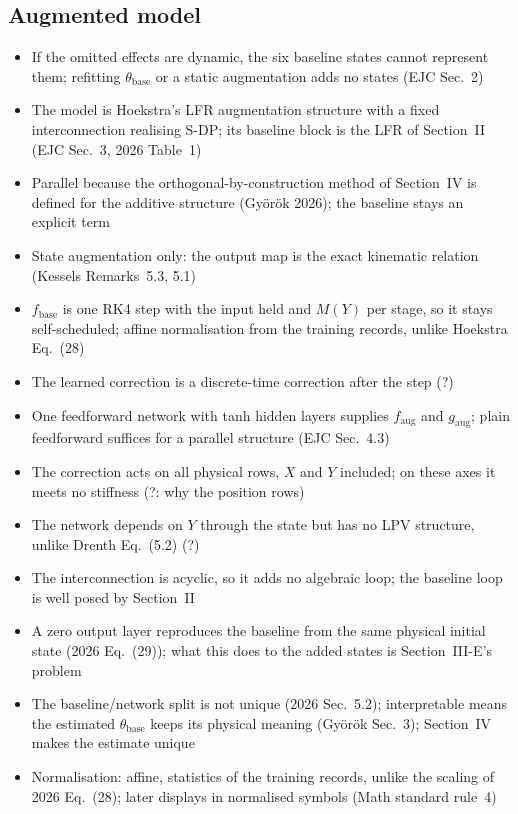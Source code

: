 \subsection{Augmented model}\label{sec:aug_structure}
\ifdraft
\begin{itemize}
\item If the omitted effects are dynamic, the six baseline states cannot represent them; refitting $\theta_{\mathrm{base}}$ or a static augmentation adds no states (EJC Sec.~2)
\item The model is Hoekstra's LFR augmentation structure with a fixed interconnection realising S-DP; its baseline block is the LFR of Section~II (EJC Sec.~3, 2026 Table~1)
\item Parallel because the orthogonal-by-construction method of Section~IV is defined for the additive structure (Gy\"or\"ok 2026); the baseline stays an explicit term
\item State augmentation only: the output map is the exact kinematic relation (Kessels Remarks~5.3, 5.1)
\item $f_{\mathrm{base}}$ is one RK4 step with the input held and $M(Y)$ per stage, so it stays self-scheduled; affine normalisation from the training records, unlike Hoekstra Eq.~(28)
\item The learned correction is a discrete-time correction after the step (?)
\item One feedforward network with tanh hidden layers supplies $f_{\mathrm{aug}}$ and $g_{\mathrm{aug}}$; plain feedforward suffices for a parallel structure (EJC Sec.~4.3)
\item The correction acts on all physical rows, $X$ and $Y$ included; on these axes it meets no stiffness (?: why the position rows)
\item The network depends on $Y$ through the state but has no LPV structure, unlike Drenth Eq.~(5.2) (?)
\item The interconnection is acyclic, so it adds no algebraic loop; the baseline loop is well posed by Section~II
\item A zero output layer reproduces the baseline from the same physical initial state (2026 Eq.~(29)); what this does to the added states is Section~III-E's problem
\item The baseline/network split is not unique (2026 Sec.~5.2); interpretable means the estimated $\theta_{\mathrm{base}}$ keeps its physical meaning (Gy\"or\"ok Sec.~3); Section~IV makes the estimate unique
\item Normalisation: affine, statistics of the training records, unlike the scaling of 2026 Eq.~(28); later displays in normalised symbols (Math standard rule~4)
\end{itemize}
\fi

